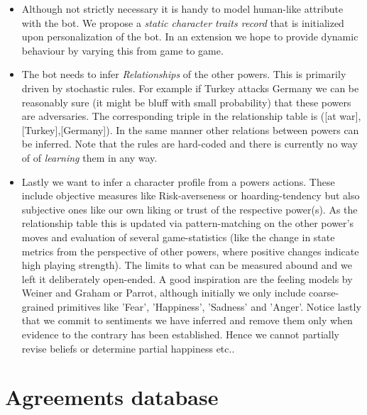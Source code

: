 \documentclass[pdftex,12pt,a4paper]{report}
\begin{document}
\begin{itemize}

\item Although not strictly necessary it is handy to model
      human-like attribute with the bot. We propose a
      \textit{static character traits record} that is 
      initialized upon personalization of the bot. In an 
      extension we hope to provide dynamic behaviour by
      varying this from game to game.

\item The bot needs to infer \textit{Relationships} of the
      other powers. This is primarily driven by stochastic rules.
      For example if Turkey attacks Germany we can be reasonably 
      sure (it might be bluff with small probability) that these
      powers are adversaries. The corresponding triple in the
      relationship table is ([at war],[Turkey],[Germany]). In the  
      same manner other relations between powers can be inferred. 
      Note that the rules are hard-coded and there is currently
      no way of of \textit{learning} them in any way.

\item Lastly we want to infer a character profile from a powers actions.
      These include objective measures like Risk-averseness or 
      hoarding-tendency but also subjective ones like our own 
      liking or trust of the respective power(s). As the relationship table this
      is updated via pattern-matching on the other power's moves and
      evaluation of several game-statistics (like the change in 
      state metrics from the perspective of other powers, where positive
      changes indicate high playing strength). The limits to what can
      be measured abound and we left it deliberately open-ended. A good
      inspiration are the feeling models by Weiner and Graham or 
      Parrot, although initially we only include coarse-grained primitives
      like  'Fear', 'Happiness', 'Sadness' and 'Anger'. Notice lastly that
      we commit to sentiments we have inferred and remove them only 
      when evidence to the contrary has been established. Hence we cannot
      partially revise beliefs or determine partial happiness etc..

\end{itemize}

\section{Agreements database}
\end{document}

